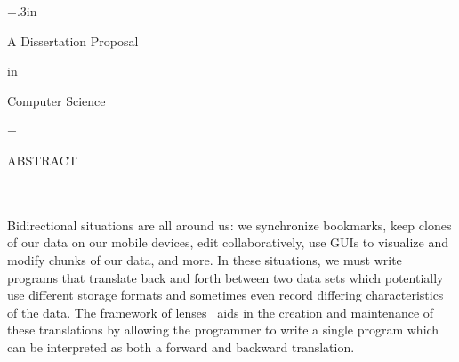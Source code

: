 \doublespaced
\large\newlength{\oldparskip}\setlength\oldparskip{\parskip}\parskip=.3in
\thispagestyle{empty}
\begin{center}
\vspace*{\fill}
\thetitle

\theauthor


A Dissertation Proposal

in

Computer Science
\end{center}


\noindent\singlespaced\large
\phantom{Presented to the Faculties of the University of Pennsylvania in Partial
Fulfillment of the Requirements for the Degree of Doctor of Philosophy}


\doublespaced\large
\begin{center}
\theyear
\end{center}




\vspace*{\fill}

\normalsize\parskip=\oldparskip


\newpage
\doublespaced


\newpage
\begin{center}
  ABSTRACT\\
\thetitle\\
\vspace{.5in}
  \theauthor\\
  \theadvisor
\end{center}

\singlespaced
\noindent

Bidirectional situations are all around us: we synchronize bookmarks, keep
clones of our data on our mobile devices, edit collaboratively, use GUIs to
visualize and modify chunks of our data, and more. In these situations, we
must write programs that translate back and forth between two data sets
which potentially use different storage formats and sometimes even record
differing characteristics of the data. The framework of
lenses~\cite{FosterThesis} aids in the creation and maintenance of these
translations by allowing the programmer to write a single program which can
be interpreted as both a forward and backward translation.

